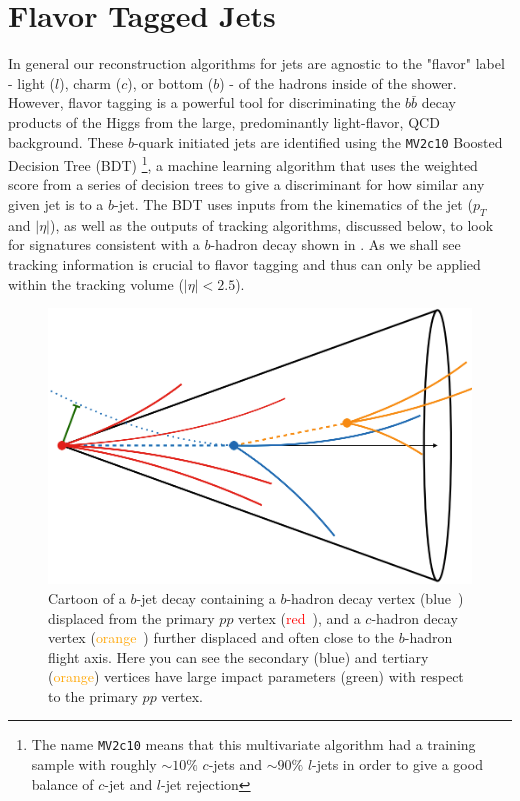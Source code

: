 \section{Flavor Tagged Jets} \label{sec:objects:flavor_tagging}

In general our reconstruction algorithms for jets are agnostic to the "flavor"
label - light ($l$), charm ($c$), or bottom ($b$) - of the hadrons inside of
the shower.  However, flavor tagging \cite{Aad:2015ydr} is a powerful tool for
discriminating the $b\bar{b}$ decay products of the Higgs from the large,
predominantly light-flavor, QCD background.  These $b$-quark initiated jets are
identified using the \texttt{MV2c10} \cite{ATL-PHYS-PUB-2015-022} Boosted
Decision Tree (BDT) \footnote{The name \texttt{MV2c10} means that this
multivariate algorithm had a training sample with roughly $\sim10\%$ $c$-jets and
$\sim90\%$ $l$-jets in order to give a good balance of $c$-jet and $l$-jet
rejection}, a machine learning algorithm that uses the weighted score from a
series of decision trees to give a discriminant for how similar any given jet
is to a $b$-jet.  The BDT uses inputs from the kinematics of the jet ($p_{T}$
and $|\eta|$), as well as the outputs of tracking algorithms, discussed below,
to look for signatures consistent with a $b$-hadron decay shown in
.  As we shall see tracking information is crucial to
flavor tagging and thus can only be applied within the tracking volume ($|\eta|
< 2.5$).

\begin{figure}[!htbp]
  \centering
  \includegraphics[width=0.8\linewidth]{figures/objects/b_decay}
  \caption{\cite{Chisholm:bjet} Cartoon of a $b$-jet decay containing a
$b$-hadron decay vertex (\textcolor{track_blue}{blue}~\protect{})
displaced from the primary $pp$ vertex (\textcolor{red}{red}~\protect{}),
and a $c$-hadron decay vertex (\textcolor{orange}{orange}~\protect{})
further displaced and often close to the $b$-hadron flight axis. Here you can see the
secondary (\textcolor{track_blue}{blue}) and tertiary
(\textcolor{orange}{orange}) vertices have large impact parameters
(\textcolor{IPgreen}{green}) with respect to the primary $pp$ vertex.}
  \label{sec:objects:b_decay}
\end{figure}

